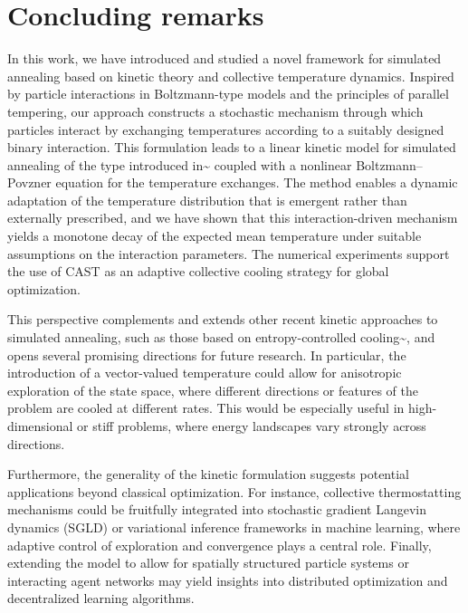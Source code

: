 \documentclass[10pt,a4paper]{article}
\theoremstyle{theorem}
\numberwithin{equation}{section}
\begin{document}
\section{Concluding remarks}
In this work, we have introduced and studied a novel framework for simulated annealing based on kinetic theory and collective temperature dynamics. Inspired by particle interactions in Boltzmann-type models and the principles of parallel tempering, our approach constructs a stochastic mechanism through which particles interact by exchanging temperatures according to a suitably designed binary interaction. This formulation leads to a linear kinetic model for simulated annealing of the type introduced in^^>\cite{pareschi_optimization_2024} coupled with a nonlinear Boltzmann--Povzner equation for the temperature exchanges.
The method enables a dynamic adaptation of the temperature distribution that is emergent rather than externally prescribed, and we have shown that this interaction-driven mechanism yields a monotone decay of
the expected mean temperature under suitable assumptions on the interaction
parameters. The numerical experiments support the use of CAST as an adaptive
collective cooling strategy for global optimization.

This perspective complements and extends other recent kinetic approaches to simulated annealing, such as those based on entropy-controlled cooling^^>\cite{herty_kinetic_2026}, and opens several promising directions for future research. In particular, the introduction of a vector-valued temperature could allow for anisotropic exploration of the state space, where different directions or features of the problem are cooled at different rates. This would be especially useful in high-dimensional or stiff problems, where energy landscapes vary strongly across directions.

Furthermore, the generality of the kinetic formulation suggests potential applications beyond classical optimization. For instance, collective thermostatting mechanisms could be fruitfully integrated into stochastic gradient Langevin dynamics (SGLD) or variational inference frameworks in machine learning, where adaptive control of exploration and convergence plays a central role. Finally, extending the model to allow for spatially structured particle systems or interacting agent networks may yield insights into distributed optimization and decentralized learning algorithms.
\end{document}
